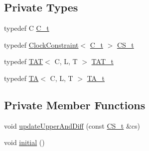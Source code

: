 \subsection*{Private Types}
\begin{DoxyCompactItemize}
\item 
typedef C \mbox{\hyperlink{classgraphsat_1_1_t_a_t_ace8284b3c7a4cbf6cb5527368243342d}{C\+\_\+t}}
\item 
typedef \mbox{\hyperlink{classgraphsat_1_1_clock_constraint}{Clock\+Constraint}}$<$ \mbox{\hyperlink{classgraphsat_1_1_t_a_t_ace8284b3c7a4cbf6cb5527368243342d}{C\+\_\+t}} $>$ \mbox{\hyperlink{classgraphsat_1_1_t_a_t_a0268b3d54214d8cc91b0bca9a961daa0}{C\+S\+\_\+t}}
\item 
typedef \mbox{\hyperlink{classgraphsat_1_1_t_a_t}{T\+AT}}$<$ C, L, T $>$ \mbox{\hyperlink{classgraphsat_1_1_t_a_t_a680323f63f58b3cb8e788d8e9ed65e16}{T\+A\+T\+\_\+t}}
\item 
typedef \mbox{\hyperlink{classgraphsat_1_1_t_a}{TA}}$<$ C, L, T $>$ \mbox{\hyperlink{classgraphsat_1_1_t_a_t_a0936ee5b3b460c37d9b2a850d17a0844}{T\+A\+\_\+t}}
\end{DoxyCompactItemize}
\subsection*{Private Member Functions}
\begin{DoxyCompactItemize}
\item 
void \mbox{\hyperlink{classgraphsat_1_1_t_a_t_a53d6ddf94336e2a2e1ee2c368fdd5434}{update\+Upper\+And\+Diff}} (const \mbox{\hyperlink{classgraphsat_1_1_t_a_t_a0268b3d54214d8cc91b0bca9a961daa0}{C\+S\+\_\+t}} \&cs)
\item 
void \mbox{\hyperlink{classgraphsat_1_1_t_a_t_af9a158cc51508cb3c61b0025fbaebb88}{initial}} ()
\end{DoxyCompactItemize}

